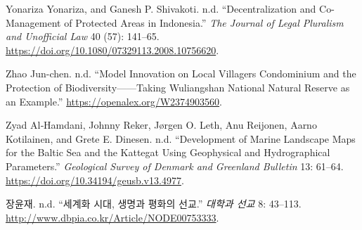 \begin{CSLReferences}{1}{0}
Yonariza Yonariza, and Ganesh P. Shivakoti. n.d. {``Decentralization and
Co-Management of Protected Areas in Indonesia.''} \emph{The Journal of
Legal Pluralism and Unofficial Law} 40 (57): 141--65.
\url{https://doi.org/10.1080/07329113.2008.10756620}.

Zhao Jun-chen. n.d. {``Model Innovation on Local Villagers Condominium
and the Protection of Biodiversity------Taking Wuliangshan National
Natural Reserve as an Example.''}
\url{https://openalex.org/W2374903560}.

Zyad Al‐Hamdani, Johnny Reker, Jørgen O. Leth, Anu Reijonen, Aarno
Kotilainen, and Grete E. Dinesen. n.d. {``Development of Marine
Landscape Maps for the Baltic Sea and the Kattegat Using Geophysical and
Hydrographical Parameters.''} \emph{Geological Survey of Denmark and
Greenland Bulletin} 13: 61--64.
\url{https://doi.org/10.34194/geusb.v13.4977}.

장윤재. n.d. {``세계화 시대, 생명과 평화의 선교.''} \emph{대학과 선교}
8: 43--113. \url{http://www.dbpia.co.kr/Article/NODE00753333}.

\end{CSLReferences}
